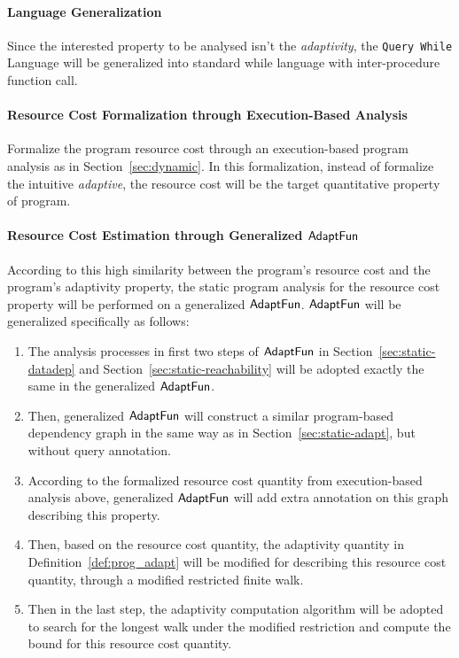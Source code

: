 \paragraph*{Language Generalization} Since the interested property 
to be analysed isn't the \emph{adaptivity},
the {\tt Query While} Language will be generalized into standard while language with inter-procedure function call.
\paragraph*{Resource Cost Formalization through Execution-Based Analysis} 
Formalize the program resource cost through an execution-based program analysis as in Section~\ref{sec:dynamic}.
In this formalization, instead of formalize the intuitive \emph{adaptive}, the resource cost will be the
target quantitative property of program.
\paragraph*{Resource Cost Estimation through Generalized $\textsf{AdaptFun}$}
According to this high similarity between the program's resource cost and the 
program's adaptivity property, the static program analysis for the resource cost property will 
be performed on a generalized  $\textsf{AdaptFun}$.  $\textsf{AdaptFun}$ will be generalized specifically as follows:
\begin{enumerate}
    \item The analysis processes in first two steps of $\textsf{AdaptFun}$ in Section~\ref{sec:static-datadep}
    and Section~\ref{sec:static-reachability} will be adopted exactly the same in the generalized $\textsf{AdaptFun}$.
    \item Then, generalized $\textsf{AdaptFun}$ will construct a similar program-based dependency graph 
    in the same way as in Section~\ref*{sec:static-adapt}, but without query annotation. 
    \item According to the formalized resource cost quantity from execution-based analysis above,
    generalized $\textsf{AdaptFun}$ will add extra annotation on this graph describing this property.
    \item Then, based on the resource cost quantity, the adaptivity quantity in Definition~\ref{def:prog_adapt}
    will be modified for describing this resource cost quantity, through a modified restricted finite walk.
    \item Then in the last step, the adaptivity computation algorithm will be adopted to search for the longest 
    walk under the modified restriction and compute the bound for 
    this resource cost quantity.
\end{enumerate}

